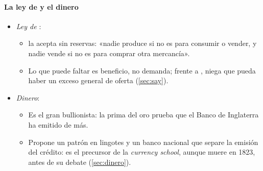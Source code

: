 \documentclass[11pt]{article}
\begin{document}
\paragraph{La ley de  y el dinero}\label{sec:ricardo-say}
\begin{itemize}
\item \emph{Ley de }:
  \begin{itemize}
  \item {} la acepta sin reservas: «nadie produce si no es para consumir o vender, y nadie vende si no es para comprar otra mercancía»\nocite{Ricardo1821Principles}.
  \item Lo que puede faltar es beneficio, no demanda; frente a , niega que pueda haber un exceso general de oferta (\ref{sec:say}).
  \end{itemize}
\item \emph{Dinero}:
  \begin{itemize}
  \item Es el gran bullionista: la prima del oro prueba que el Banco de Inglaterra ha emitido de más\nocite{Ricardo1810HighPrice}.
  \item Propone un patrón en lingotes\nocite{Ricardo1816Proposals} y un banco nacional que separe la emisión del crédito\nocite{Ricardo1824Plan}: es el precursor de la \emph{currency school}, aunque muere en 1823, antes de su debate (\ref{sec:dinero}).
  \end{itemize}
\end{itemize}
\end{document}
